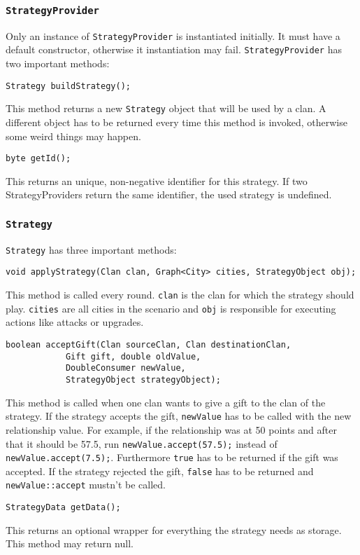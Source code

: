 \documentclass{article}
\begin{document}
\subsubsection{\texttt{StrategyProvider}}
Only an instance of \texttt{StrategyProvider} is instantiated initially. It must have a default constructor, otherwise it instantiation may fail. \texttt{StrategyProvider} has two important methods:
\begin{verbatim}
Strategy buildStrategy();
\end{verbatim}
This method returns a new \texttt{Strategy} object that will be used by a clan. A different object has to be returned every time this method is invoked, otherwise some weird things may happen.
\begin{verbatim}
byte getId();
\end{verbatim}
This returns an unique, non-negative identifier for this strategy. If two StrategyProviders return the same identifier, the used strategy is undefined.
\subsubsection{\texttt{Strategy}}
\texttt{Strategy} has three important methods:
\begin{verbatim}
void applyStrategy(Clan clan, Graph<City> cities, StrategyObject obj);
\end{verbatim}
This method is called every round. \texttt{clan} is the clan for which the strategy should play. \texttt{cities} are all cities in the scenario and  \texttt{obj} is responsible for executing
actions like attacks or upgrades.
\begin{verbatim}
boolean acceptGift(Clan sourceClan, Clan destinationClan,
			Gift gift, double oldValue,
			DoubleConsumer newValue,
			StrategyObject strategyObject);
\end{verbatim}
This method is called when one clan wants to give a gift to the clan of the strategy. If the strategy accepts the gift, \texttt{newValue} has to be called with the new relationship value. For example, if the relationship
was at 50 points and after that it should be 57.5, run \texttt{newValue.accept(57.5);} instead of \texttt{newValue.accept(7.5);}. Furthermore \texttt{true} has to be returned if the gift was accepted.
If the strategy rejected the gift, \texttt{false} has to be returned and \texttt{newValue::accept} mustn't be called.
\begin{verbatim}
StrategyData getData();
\end{verbatim}
This returns an optional wrapper for everything the strategy needs as storage. This method may return null.
\end{document}
